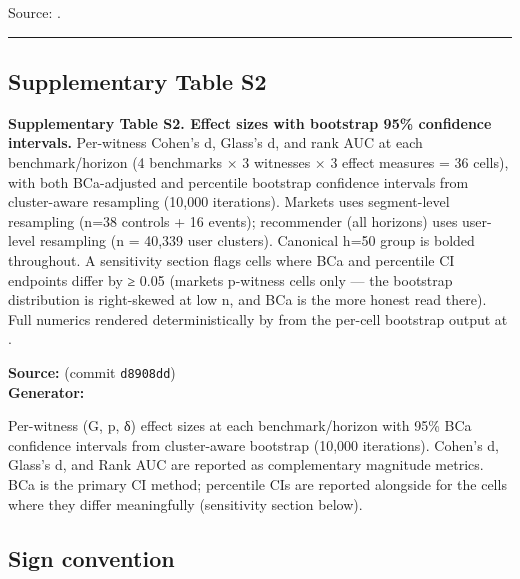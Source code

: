 \documentclass[
  11pt,
]{article}
\begin{document}
Source:
\texttt{}.

\begin{center}\rule{0.5\linewidth}{0.5pt}\end{center}

\subsection{Supplementary Table S2}\label{supplementary-table-s2}

\textbf{Supplementary Table S2. Effect sizes with bootstrap 95\%
confidence intervals.} Per-witness Cohen's d, Glass's d, and rank AUC at
each benchmark/horizon (4 benchmarks × 3 witnesses × 3 effect measures =
36 cells), with both BCa-adjusted and percentile bootstrap confidence
intervals from cluster-aware resampling (10,000 iterations). Markets
uses segment-level resampling (n=38 controls + 16 events); recommender
(all horizons) uses user-level resampling (n = 40,339 user clusters).
Canonical h=50 group is bolded throughout. A sensitivity section flags
cells where BCa and percentile CI endpoints differ by ≥ 0.05 (markets
p-witness cells only --- the bootstrap distribution is right-skewed at
low n, and BCa is the more honest read there). Full numerics rendered
deterministically by
\texttt{} from the
per-cell bootstrap output at
\texttt{}.

\textbf{Source:}
\texttt{}
(commit \texttt{d8908dd})\\
\textbf{Generator:}
\texttt{}

Per-witness (G, p, δ) effect sizes at each benchmark/horizon with 95\%
BCa confidence intervals from cluster-aware bootstrap (10,000
iterations). Cohen's d, Glass's d, and Rank AUC are reported as
complementary magnitude metrics. BCa is the primary CI method;
percentile CIs are reported alongside for the cells where they differ
meaningfully (sensitivity section below).

\subsection{Sign convention}\label{sign-convention}
\end{document}
